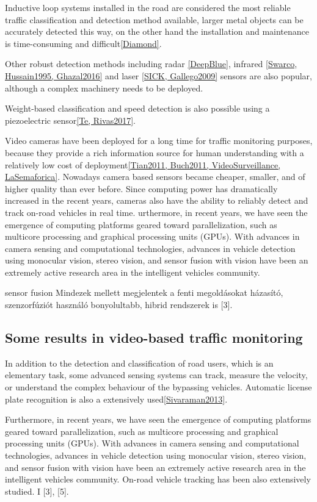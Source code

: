 Inductive loop systems installed in the road are considered the most reliable traffic classification and detection method available, larger metal objects can be accurately detected this way, on the other hand the installation and maintenance is time-consuming and difficult\ref{Diamond}.

Other robust detection methods including radar \ref{DeepBlue}, infrared \ref{Swarco, Hussain1995, Ghazal2016} and laser \ref{SICK, Gallego2009} sensors are also popular, although a complex machinery needs to be deployed.

Weight-based classification and speed detection is also possible using a piezoelectric sensor\ref{Te, Rivas2017}.

Video cameras have been deployed for a long time for traffic monitoring purposes, because they provide a rich information source for human understanding with a relatively low cost of deployment\ref{Tian2011, Buch2011, VideoSurveillance, LaSemaforica}.
Nowadays camera based sensors became cheaper, smaller, and of higher quality than ever before.
Since computing power has dramatically increased in the recent years, cameras also have the ability to reliably detect and track on-road vehicles in real time.
urthermore, in recent years, we have
seen the emergence of computing platforms geared toward
parallelization, such as multicore processing and graphical processing
units (GPUs). 
With advances in camera sensing and computational technologies,
advances in vehicle detection using monocular vision,
stereo vision, and sensor fusion with vision have been
an extremely active research area in the intelligent vehicles
community.

sensor fusion
Mindezek mellett megjelentek a fenti megoldásokat házasító, szenzorfúziót használó bonyolultabb,
hibrid rendszerek is [3].

\subsection{Some results in video-based traffic monitoring}

In addition to the detection and classification of road users, which is an elementary task, some advanced sensing systems can track, measure the velocity, or understand the complex behaviour of the bypassing vehicles.
Automatic license plate recognition is also a extensively used\ref{Sivaraman2013}. 

 Furthermore, in recent years, we have
seen the emergence of computing platforms geared toward
parallelization, such as multicore processing and graphical processing
units (GPUs). 
With advances in camera sensing and computational technologies,
advances in vehicle detection using monocular vision,
stereo vision, and sensor fusion with vision have been
an extremely active research area in the intelligent vehicles
community. On-road vehicle tracking has been also extensively
studied. I [3], [5].


